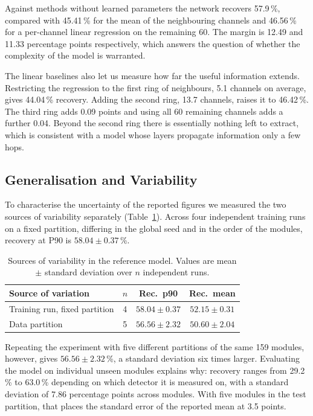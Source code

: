 \documentclass[10pt,conference]{IEEEtran}
\begin{document}
Against methods without learned parameters the network recovers 57.9\,\%,
compared with 45.41\,\% for the mean of the neighbouring channels and
46.56\,\% for a per-channel linear regression on the remaining 60. The margin
is 12.49 and 11.33 percentage points respectively, which answers the question
of whether the complexity of the model is warranted.

The linear baselines also let us measure how far the useful information
extends. Restricting the regression to the first ring of neighbours, 5.1
channels on average, gives 44.04\,\% recovery. Adding the second ring, 13.7
channels, raises it to 46.42\,\%. The third ring adds 0.09 points and using all
60 remaining channels adds a further 0.04. Beyond the second ring there is
essentially nothing left to extract, which is consistent with a model whose
layers propagate information only a few hops.

\subsection{Generalisation and Variability}
\label{sec:res-variability}
To characterise the uncertainty of the reported figures we measured the two
sources of variability separately (Table~\ref{tab:reference}).
Across four independent training runs on a fixed partition, differing in the
global seed and in the order of the modules, recovery at P90 is
$58.04 \pm 0.37$\,\%.

\begin{table}[t]
\centering
\caption{Sources of variability in the reference model. Values are
mean $\pm$ standard deviation over $n$ independent runs.}
\label{tab:reference}
\begin{tabular}{@{}lccc@{}}
\toprule
\textbf{Source of variation} & \textbf{$n$} & \textbf{Rec.\ p90} & \textbf{Rec.\ mean} \\
\midrule
Training run, fixed partition & 4 & $58.04 \pm 0.37$ & $52.15 \pm 0.31$ \\
Data partition                & 5 & $56.56 \pm 2.32$ & $50.60 \pm 2.04$ \\
\bottomrule
\end{tabular}
\end{table}

Repeating the experiment with five different partitions of the same 159
modules, however, gives $56.56 \pm 2.32$\,\%, a standard deviation six times
larger. Evaluating the model on individual unseen modules explains why:
recovery ranges from
29.2\,\% to 63.0\,\% depending on which detector it is measured on, with a
standard deviation of 7.86 percentage points across modules. With five modules
in the test partition, that places the standard error of the reported mean at
3.5 points.
\end{document}
